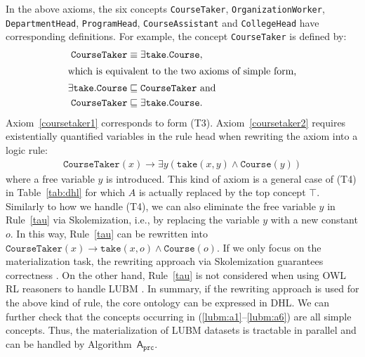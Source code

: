 In the above axioms, the six concepts \texttt{CourseTaker}, \texttt{OrganizationWorker},
\texttt{DepartmentHead}, \texttt{ProgramHead}, \texttt{CourseAssistant}
and \texttt{CollegeHead} have corresponding definitions.
For example, the concept \texttt{CourseTaker} is defined by:
\begin{align}
  \texttt{CourseTaker} & \equiv\exists\texttt{take}.\texttt{Course},\notag\\
  \intertext{which is equivalent to the two axioms of simple form,}
  \exists\texttt{take}.\texttt{Course} &
                                         \sqsubseteq\texttt{CourseTaker} \mbox{ and}\label{coursetaker1}\\
  \texttt{CourseTaker} &
                         \sqsubseteq\exists\texttt{take}.\texttt{Course}.\label{coursetaker2}
\end{align}
Axiom~\eqref{coursetaker1} corresponds to form
(T3). Axiom~\eqref{coursetaker2} requires existentially quantified
variables in the rule head when rewriting the axiom into a logic rule:
\begin{align}
\texttt{CourseTaker}(x)\rightarrow\exists y(\texttt{take}(x,y)\wedge
  \texttt{Course}(y))\label{tau}\tag{$\tau$}
\end{align}
where a free variable $y$ is introduced. This kind of axiom is a general case of (T4) in Table~\ref{tab:dhl}
for which $A$ is actually replaced by the top concept $\top$.
Similarly to how we handle (T4), we can also eliminate the free variable $y$
in Rule~\eqref{tau} via Skolemization, i.e., by replacing the variable $y$ with a new constant $o$.
In this way, Rule~\eqref{tau} can be rewritten into $\texttt{CourseTaker}(x)\rightarrow\texttt{take}(x,o)\wedge \texttt{Course}(o)$.
If we only focus on the materialization task, the rewriting approach via Skolemization guarantees 
correctness \cite{GrauHKKMMW13}.
On the other hand, Rule~\eqref{tau} is not considered when using OWL RL reasoners to handle LUBM \cite{UrbaniKMHB12,WeaverH09}.
In summary, if the rewriting approach is used for the above kind of rule,
the core ontology can be expressed in DHL.
We can further check that the concepts occurring in (\ref{lubm:a1}--\ref{lubm:a6})
are all simple concepts. Thus,
the materialization of LUBM datasets is tractable in parallel and can be handled by
Algorithm~$\mathsf{A}_{\texttt{prc}}$.



